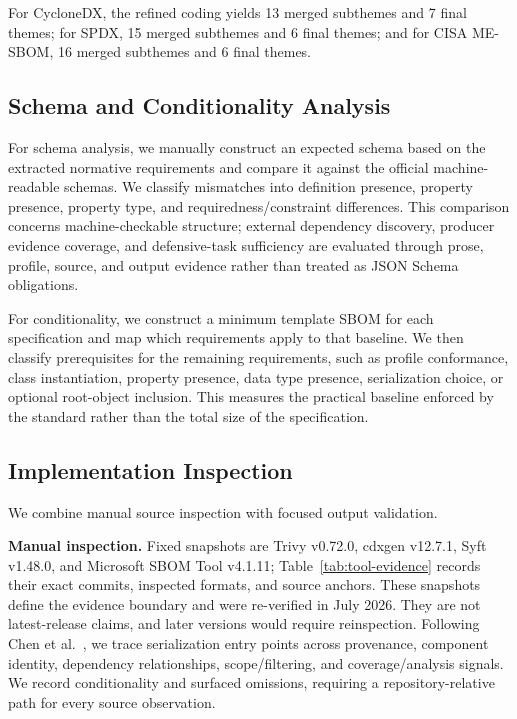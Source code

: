 For CycloneDX, the refined coding yields 13 merged subthemes and 7 final themes; for SPDX, 15 merged subthemes and 6 final themes; and for CISA ME-SBOM, 16 merged subthemes and 6 final themes. 

\subsection{Schema and Conditionality Analysis}
\label{subsec:schemaandconditionalityanalysis}
For schema analysis, we manually construct an expected schema based on the extracted normative requirements and compare it against the official machine-readable schemas. We classify mismatches into definition presence, property presence, property type, and requiredness/constraint differences. This comparison concerns machine-checkable structure; external dependency discovery, producer evidence coverage, and defensive-task sufficiency are evaluated through prose, profile, source, and output evidence rather than treated as JSON Schema obligations.

For conditionality, we construct a minimum template SBOM for each specification and map which requirements apply to that baseline. We then classify prerequisites for the remaining requirements, such as profile conformance, class instantiation, property presence, data type presence, serialization choice, or optional root-object inclusion. This measures the practical baseline enforced by the standard rather than the total size of the specification.

\subsection{Implementation Inspection}
\label{subsec:implementationinspection}
We combine manual source inspection with focused output validation. 

\textbf{Manual inspection.}
Fixed snapshots are Trivy v0.72.0, cdxgen v12.7.1, Syft v1.48.0, and Microsoft SBOM Tool v4.1.11; Table~\ref{tab:tool-evidence} records their exact commits, inspected formats, and source anchors. These snapshots define the evidence boundary and were re-verified in July 2026. They are not latest-release claims, and later versions would require reinspection. Following Chen et al.~\cite{chen2024}, we trace serialization entry points across provenance, component identity, dependency relationships, scope/filtering, and coverage/analysis signals. We record conditionality and surfaced omissions, requiring a repository-relative path for every source observation.

